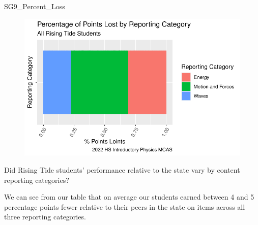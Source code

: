 \documentclass[
  letterpaper,
  DIV=11,
  numbers=noendperiod]{scrartcl}
\newenvironment{Shaded}{\begin{snugshade}}{\end{snugshade}}
\newcommand{\NormalTok}[1]{\textcolor[rgb]{0.00,0.23,0.31}{#1}}
\begin{document}
\begin{Shaded}
\begin{Highlighting}[]
\NormalTok{SG9\_Percent\_Loss}
\end{Highlighting}
\end{Shaded}

\begin{figure}[H]

{\centering \includegraphics{theresaSzczepanski_final_files/figure-pdf/unnamed-chunk-15-1.pdf}

}

\end{figure}

Did Rising Tide students' performance relative to the state vary by
content reporting categories?

We can see from our table that on average our students earned between 4
and 5 percentage points fewer relative to their peers in the state on
items across all three reporting categories.
\end{document}
